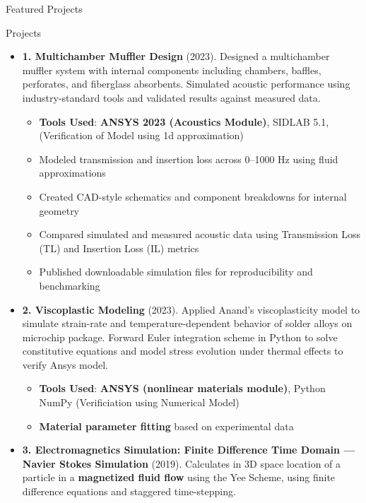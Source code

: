 \documentclass[]{mcdowellcv}
\begin{document}
\makeheader


\begin{cvsection}{Featured Projects}
  \begin{cvsubsection}{Projects}{}{}
    \begin{itemize}


\item \textbf{1. Multichamber Muffler Design} (2023). Designed a multichamber muffler system with internal components including chambers, baffles, perforates, and fiberglass absorbents. Simulated acoustic performance using industry-standard tools and validated results against measured data.
  \begin{itemize}
    \item \textbf{Tools Used}: \textbf{ANSYS 2023 (Acoustics Module)}, SIDLAB 5.1, (Verification of Model using 1d approximation)
    \item Modeled transmission and insertion loss across 0–1000 Hz using fluid approximations
    \item Created CAD-style schematics and component breakdowns for internal geometry
    \item Compared simulated and measured acoustic data using Transmission Loss (TL) and Insertion Loss (IL) metrics
    \item Published downloadable simulation files for reproducibility and benchmarking
  \end{itemize}

 \item \textbf{2. Viscoplastic Modeling} (2023). Applied Anand’s viscoplasticity model to simulate strain-rate and temperature-dependent behavior of solder alloys on microchip package. Forward Euler integration scheme in Python to solve constitutive equations and model stress evolution under thermal effects to verify Ansys model.
    \begin{itemize}
      \item \textbf{Tools Used}: \textbf{ANSYS (nonlinear materials module)}, Python NumPy (Verificiation using Numerical Model)
      \item \textbf{Material parameter fitting} based on experimental data
    \end{itemize}


 \item \textbf{3. Electromagnetics Simulation: Finite Difference Time Domain --- Navier Stokes Simulation} (2019). Calculates in 3D space location of a particle in a \textbf{magnetized fluid flow} using the Yee Scheme, using finite difference equations and staggered time-stepping.


\end{itemize}
\end{cvsubsection}
\end{cvsection}
\end{document}
